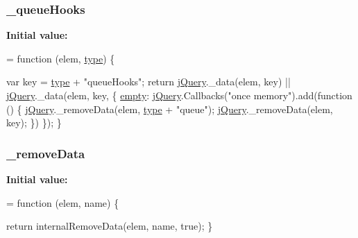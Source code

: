 \subsubsection[{\texorpdfstring{\+\_\+queue\+Hooks}{_queueHooks}}]{ \+\_\+queue\+Hooks}\hypertarget{jquery-2_82_81-vsdoc_8js_ac896bda626b829bf9f8560a239e8f20b}{}\label{jquery-2_82_81-vsdoc_8js_ac896bda626b829bf9f8560a239e8f20b}
{\bfseries Initial value\+:}
\begin{DoxyCode}
= \textcolor{keyword}{function} (elem, \hyperlink{jquery-2_82_81-vsdoc_8js_a3940565e83a9bfd10d95ffd27536da91}{type}) \{

        var key = \hyperlink{jquery-2_82_81-vsdoc_8js_a3940565e83a9bfd10d95ffd27536da91}{type} + \textcolor{stringliteral}{"queueHooks"};
        \textcolor{keywordflow}{return} \hyperlink{jquery-2_82_81-vsdoc_8js_add5237586d970a38a81f990e8eb28c6c}{jQuery}.\_data(elem, key) || \hyperlink{jquery-2_82_81-vsdoc_8js_add5237586d970a38a81f990e8eb28c6c}{jQuery}.\_data(elem, key, \{
            \hyperlink{jquery-2_82_81-vsdoc_8js_ad242f812bdc5013e0cbf15d6e4d6800a}{empty}: \hyperlink{jquery-2_82_81-vsdoc_8js_add5237586d970a38a81f990e8eb28c6c}{jQuery}.Callbacks(\textcolor{stringliteral}{"once memory"}).add(\textcolor{keyword}{function} () \{
                \hyperlink{jquery-2_82_81-vsdoc_8js_add5237586d970a38a81f990e8eb28c6c}{jQuery}.\_removeData(elem, \hyperlink{jquery-2_82_81-vsdoc_8js_a3940565e83a9bfd10d95ffd27536da91}{type} + \textcolor{stringliteral}{"queue"});
                \hyperlink{jquery-2_82_81-vsdoc_8js_add5237586d970a38a81f990e8eb28c6c}{jQuery}.\_removeData(elem, key);
            \})
        \});
    \}
\end{DoxyCode}
\subsubsection[{\texorpdfstring{\+\_\+remove\+Data}{_removeData}}]{ \+\_\+remove\+Data}\hypertarget{jquery-2_82_81-vsdoc_8js_af9946bf86d7cfbcc033908182d2358a9}{}\label{jquery-2_82_81-vsdoc_8js_af9946bf86d7cfbcc033908182d2358a9}
{\bfseries Initial value\+:}
\begin{DoxyCode}
= \textcolor{keyword}{function} (elem, name) \{

        \textcolor{keywordflow}{return} internalRemoveData(elem, name, \textcolor{keyword}{true});
    \}
\end{DoxyCode}
